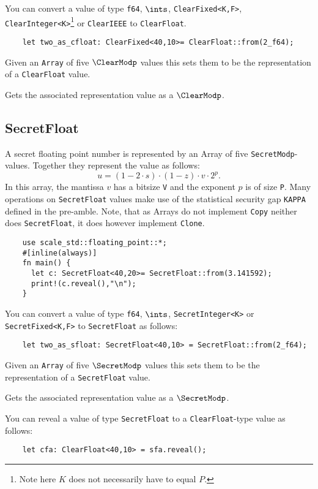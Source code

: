 You can convert a value of type \verb|f64|, $\ints$, \verb|ClearFixed<K,F>|,
\verb|ClearInteger<K>|\footnote{Note here $K$ does not necessarily have to
equal $P$.} or \verb|ClearIEEE| to \verb|ClearFloat|. 
\begin{lstlisting}
    let two_as_cfloat: ClearFixed<40,10>= ClearFloat::from(2_f64);
\end{lstlisting}

Given an \verb|Array| of five $\ClearModp$ values this sets them 
to be the representation of a \verb|ClearFloat| value.

Gets the associated representation value as a $\ClearModp$.

\subsection{SecretFloat}
A secret floating point number is represented by an Array of five \verb|SecretModp|-values. Together they represent the value as follows:
\[ u=(1-2\cdot s) \cdot (1-z) \cdot v \cdot 2^{p}. \]
In this array, the mantissa $v$ has a bitsize \verb|V| and the exponent $p$ is of size \verb|P|. 
Many operations on \verb|SecretFloat| values make use of the statistical security gap \verb|KAPPA| defined in the pre-amble. 
Note, that as Arrays do not implement \verb|Copy| neither does  \verb|SecretFloat|,
it does however implement \verb|Clone|.

\begin{lstlisting}
    use scale_std::floating_point::*;
    #[inline(always)]
    fn main() {
      let c: SecretFloat<40,20>= SecretFloat::from(3.141592);
      print!(c.reveal(),"\n");
    }
\end{lstlisting}

You can convert a value of type \verb|f64|, $\ints$, \verb|SecretInteger<K>| 
or \verb|SecretFixed<K,F>|  to 
\verb|SecretFloat| as follows:
\begin{lstlisting}
    let two_as_sfloat: SecretFloat<40,10> = SecretFloat::from(2_f64);
\end{lstlisting}

Given an \verb|Array| of five $\SecretModp$ values this sets them
to be the representation of a \verb|SecretFloat| value.

Gets the associated representation value as a $\SecretModp$.

You can reveal a value of type \verb|SecretFloat| to a \verb|ClearFloat|-type value as follows:
\begin{lstlisting}
    let cfa: ClearFloat<40,10> = sfa.reveal();
\end{lstlisting}


